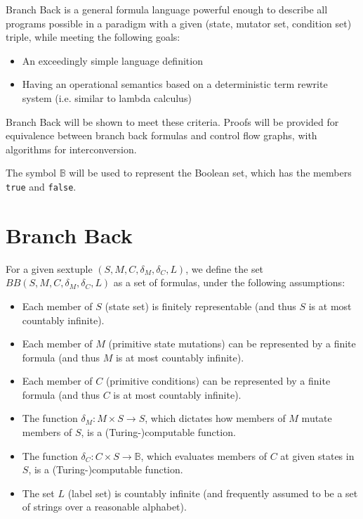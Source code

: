 \documentclass[11pt]{article}
\begin{document}
Branch Back is a general formula language powerful enough to describe all programs possible in a paradigm with a given (state, mutator set, condition set) triple, while meeting the following goals:

\begin{itemize}
\item An exceedingly simple language definition
\item Having an operational semantics based on a deterministic term rewrite system (i.e. similar to lambda calculus)
\end{itemize}

Branch Back will be shown to meet these criteria.  Proofs will be provided for equivalence between branch back formulas and control flow graphs, with algorithms for interconversion.

The symbol $\mathbb{B}$ will be used to represent the Boolean set, which has the members \texttt{true} and \texttt{false}.

\section{Branch Back}
For a given sextuple $(S, M, C, \delta_{M}, \delta_{C}, L)$, we define the set $BB(S, M, C, \delta_{M}, \delta_{C}, L)$ as a set of formulas, under the following assumptions:

\begin{itemize}
\item Each member of $S$ (state set) is finitely representable (and thus $S$ is at most countably infinite).
\item Each member of $M$ (primitive state mutations) can be represented by a finite formula (and thus $M$ is at most countably infinite).
\item Each member of $C$ (primitive conditions) can be represented by a finite formula (and thus $C$ is at most countably infinite).
\item The function $\delta_{M} : M \times S \rightarrow S$, which dictates how members of $M$ mutate members of $S$, is a (Turing-)computable function. 
\item The function $\delta_{C} : C \times S \rightarrow \mathbb{B}$, which evaluates members of $C$ at given states in $S$, is a (Turing-)computable function.
\item The set $L$ (label set) is countably infinite (and frequently assumed to be a set of strings over a reasonable alphabet).
\end{itemize}
\end{document}
